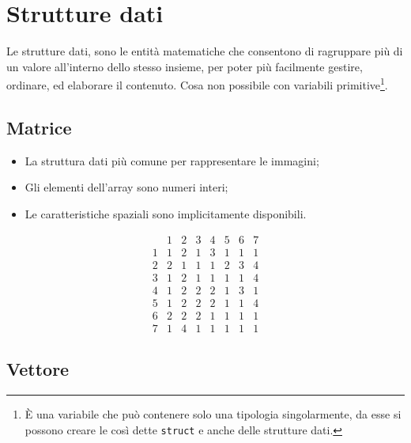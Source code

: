 \documentclass{report}
\begin{document}
\section{Strutture dati}
\label{sec:strutdati}
Le strutture dati, sono le entità matematiche che consentono di
ragruppare più di un valore all'interno dello stesso insieme, per poter
più facilmente gestire, ordinare, ed elaborare il contenuto. Cosa
non possibile con variabili primitive\footnote{È una variabile che può
  contenere solo una tipologia singolarmente, da esse si possono
  creare le così dette \lstinline|struct| e anche delle strutture dati.}.
\subsection{Matrice}
\label{sec:matrice}
\begin{itemize}
\item La struttura dati più comune per rappresentare le immagini;
\item Gli elementi dell'array sono numeri interi;
\item Le caratteristiche spaziali sono implicitamente disponibili.
\end{itemize}
\begin{equation}
  \label{eq:matrice}
  \begin{array}{c|ccccccc}
      & 1 & 2 & 3 & 4 & 5 & 6 & 7 \\\hline
    1 & 1 & 2 & 1 & 3 & 1 & 1 & 1 \\
    2 & 2 & 1 & 1 & 1 & 2 & 3 & 4 \\
    3 & 1 & 2 & 1 & 1 & 1 & 1 & 4 \\
    4 & 1 & 2 & 2 & 2 & 1 & 3 & 1 \\
    5 & 1 & 2 & 2 & 2 & 1 & 1 & 4 \\
    6 & 2 & 2 & 2 & 1 & 1 & 1 & 1 \\
    7 & 1 & 4 & 1 & 1 & 1 & 1 & 1
  \end{array}
\end{equation}

\subsection{Vettore}
\label{sec:vettore}
\end{document}

